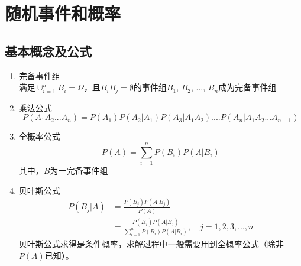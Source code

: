 \section{随机事件和概率}
\subsection{基本概念及公式}
\begin{enumerate}
	\item 完备事件组 \\
	满足$\cup_{i=1}^nB_i=\Omega$，且$B_iB_j = \emptyset$的事件组$B_1$, $B_2$, ..., $B_n$成为完备事件组

	\item 乘法公式
	\begin{equation}
	P(A_1A_2...A_n) = P(A_1)P(A_2|A_1)P(A_3|A_1A_2)....P(A_n|A_1A_2...A_{n-1})
	\end{equation}

	\item 全概率公式
	\begin{equation}
	P(A) = \sum_{i=1}^nP(B_i)P(A|B_i)
	\end{equation}
	其中，$B$为一完备事件组

	\item 贝叶斯公式
	\begin{align}
	P(B_j|A) &= \frac{P(B_j)P(A|B_j)}{P(A)} \\
	&= \frac{P(B_j)P(A|B_j)}{\sum_{i=1}^nP(B_i)P(A|B_i)},  \quad j = 1, 2, 3, ..., n
	\end{align}
	贝叶斯公式求得是条件概率，求解过程中一般需要用到全概率公式（除非$P(A)$已知）。

\end{enumerate}
